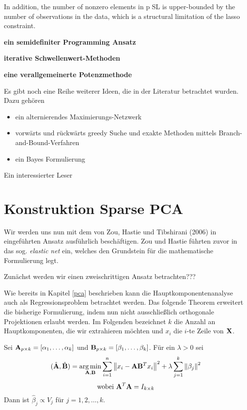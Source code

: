In addition, the
number of nonzero elements in p SL is upper-bounded by the number of
observations in the data, which is a structural limitation of the lasso constraint.

\textbf{ein semidefiniter Programming Ansatz}

\textbf{iterative Schwellenwert-Methoden}

\textbf{eine verallgemeinerte Potenzmethode}

Es gibt noch eine Reihe weiterer Ideen, die in der Literatur betrachtet wurden. Dazu gehören
\begin{itemize}
\item ein alternierendes Maximierungs-Netzwerk \cite{richtarik}
\item vorwärts und rückwärts greedy Suche und exakte Methoden mittels Branch-and-Bound-Verfahren \cite{moghaddam}
\item ein Bayes Formulierung \cite{guan}
\end{itemize}

Ein interessierter Leser 




\section{Konstruktion Sparse PCA}
\label{construction}

Wir werden uns nun mit dem von Zou, Hastie und Tibshirani (2006) in \cite{zou_sparsepca} eingeführten Ansatz ausführlich beschäftigen. Zou und Hastie führten zuvor in \cite{zou_elasticnet} das sog. \textit{elastic net} ein, welches den Grundstein für die mathematische Formulierung legt.

Zunächst werden wir einen zweischrittigen Ansatz betrachten???

Wie bereits in Kapitel \ref{pca} beschrieben kann die Hauptkomponentenanalyse auch als Regressionsproblem betrachtet werden. Das folgende Theorem erweitert die bisherige Formulierung, indem nun nicht ausschließlich orthogonale Projektionen erlaubt werden. 
Im Folgenden bezeichnet $k$ die Anzahl an Hauptkomponenten, die wir extrahieren möchten und $x_i$ die $i$-te Zeile von $\mathbf{X}$.

\begin{thm} \label{pca_regression_formulation_ridge}
Sei $\mathbf{A}_{p \times k} = [ \alpha_1, \ldots ,\alpha_k ]$ und $\mathbf{B}_{p \times k} = [ \beta_1, \ldots ,\beta_k ]$. Für ein $\lambda > 0$ sei
$$(\hat{\mathbf{A}}, \hat{\mathbf{B}}) = \operatorname*{arg\,min}_{\mathbf{A}, \mathbf{B}} \sum_{i=1}^{n} \left\lVert x_i - \mathbf{A}\mathbf{B}^Tx_i \right\rVert^2 + \lambda \sum_{j=1}^{k}\left\lVert \beta_j \right\rVert^2$$
$$\text{wobei } \mathbf{A}^T\mathbf{A} = I_{k \times k}$$
Dann ist $\hat{\beta}_j \propto V_j$ für $j = 1,2,\ldots,k$. 
\end{thm}

